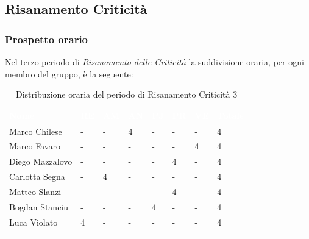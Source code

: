 \subsection{Risanamento Criticità}
\label{PRC3}

\subsubsection{Prospetto orario}
Nel terzo periodo di \textit{Risanamento delle Criticità} la suddivisione oraria, per ogni membro del gruppo, è la seguente:

\begin{longtable}{|C{.30\textwidth}|C{.06\textwidth}|C{.06\textwidth}|C{.06\textwidth} | C{.06\textwidth}| C{.06\textwidth} | C{.06\textwidth} | C{.10\textwidth} |}
\hline
{}	\textbf{\textcolor{white}{Nome}} & \textbf{\textcolor{white}{RE}} & \textbf{\textcolor{white}{AM}} & \textbf{\textcolor{white}{AN}} & \textbf{\textcolor{white}{PJ}} & \textbf{\textcolor{white}{PR}} & \textbf{\textcolor{white}{VE}} & \textbf{\textcolor{white}{Totale}}\\
\hline 
	Marco Chilese & - & - & 4 & - & - & - & 4 \\
	\hline
	Marco Favaro & - & - & - & - & - & 4 & 4 \\
	\hline
	Diego Mazzalovo & - & - & - & - & 4 & - & 4 \\
	\hline
	Carlotta Segna & - & 4 & - & - & - & - & 4 \\
	\hline
	Matteo Slanzi & - & - & - & - & 4 & - & 4 \\
	\hline
	Bogdan Stanciu & - & - & - & 4 & - & - & 4 \\
	\hline
	Luca Violato & 4 & - & - & - & - & - & 4 \\   
	\hline
	
	
	\caption{Distribuzione oraria del periodo di Risanamento Criticità 3}
	\label{Distribuzione oraria rc3}
\end{longtable}

